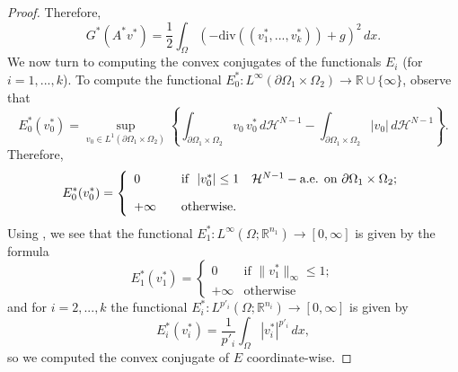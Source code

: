 \documentclass[reqno,12pt]{amsart}
\numberwithin{equation}{section}
\newcommand{\twopartdef}[4]
{
	\left\{
	\begin{array}{ll}
		#1 & #2 \\
		#3 & #4
	\end{array}
	\right.
}
\begin{document}
\begin{proof}
Therefore,
\begin{equation}\label{eq:formulaforgstar}
G^*(A^*v^*) = \displaystyle\frac12 \int_\Omega ( -\mathrm{div}((v_1^*,...,v_k^*))  + g)^2 \, dx.
\end{equation}
We now turn to computing the convex conjugates of the functionals $E_i$ (for $i = 1,...,k$). To compute the functional $E_0^*: L^\infty(\partial\Omega_1 \times \Omega_2) \rightarrow \mathbb{R} \cup \{ \infty \}$,
observe that
$$E_0^*(v_0^*) = \sup_{v_0 \in L^1(\partial\Omega_1 \times \Omega_2)} \left\{ \int_{\partial \Omega_1 \times \Omega_2} v_0 \, v_0^* \, d\mathcal{H}^{N-1} - \int_{\partial\Omega_1 \times \Omega_2} |v_0| \, d\mathcal{H}^{N-1} \right\}.$$
Therefore,
\begin{equation}\label{eq:formulafore0star}
E_0^*(v_0^*) = \left\{ \begin{array}{ll} \displaystyle  0 \quad &\hbox{if} \ \  |v_0^*| \leq 1 \quad \mathcal{H}^{N-1}-\mbox{a.e. on } \partial\Omega_1 \times \Omega_2; \\[10pt] +\infty \quad &\hbox{otherwise.}   \end{array}  \right.
\end{equation}
Using \cite[Proposition IV.1.2]{EkelandTemam}, we see that the functional $E_1^*: L^\infty(\Omega; \mathbb{R}^{n_1}) \rightarrow [0,\infty]$ is given by the formula
$$E_1^*(v_1^*) = \twopartdef{0}{\mbox{if } \| v_1^* \|_\infty \leq 1;}{+\infty}{\mbox{otherwise}} $$
and for $i = 2, ..., k$ the functional $E_i^*: L^{p'_i}(\Omega; \mathbb{R}^{n_i}) \rightarrow [0,\infty]$ is given by
$$ E_i^*(v_i^*) = \frac{1}{p'_i} \int_\Omega |v_i^*|^{p'_i} \, dx, $$
so we computed the convex conjugate of $E$ coordinate-wise.


\end{proof}
\end{document}

